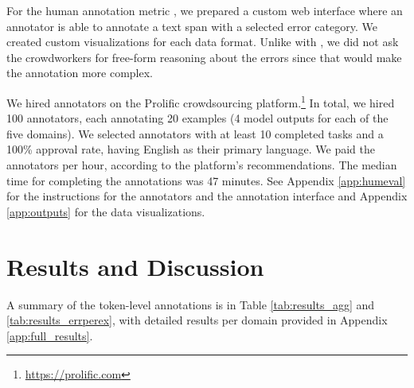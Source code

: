 For the human annotation metric \humanmetric{}, we prepared a custom web interface
where an annotator is able to annotate a text span with a selected error category. We created custom visualizations for each data format. Unlike with \gptmetric{}, we did not ask the crowdworkers for free-form reasoning about the errors since that would make the annotation more complex.

We hired annotators on the Prolific crowdsourcing platform.\footnote{\url{https://prolific.com}} In total, we hired 100 annotators, each annotating 20 examples (4 model outputs for each of the five domains). We selected annotators with at least 10 completed tasks and a 100\% approval rate, having English as their primary language. We paid the annotators  per hour, according to the platform's recommendations. The median time for completing the annotations was 47 minutes. See Appendix \ref{app:humeval} for the instructions for the annotators and the annotation interface and Appendix \ref{app:outputs} for the data visualizations.






\section{Results and Discussion}
\label{sec:discussion}

A summary of the token-level annotations is in Table \ref{tab:results_agg} and \ref{tab:results_errperex}, with detailed results per domain provided in Appendix \ref{app:full_results}.


